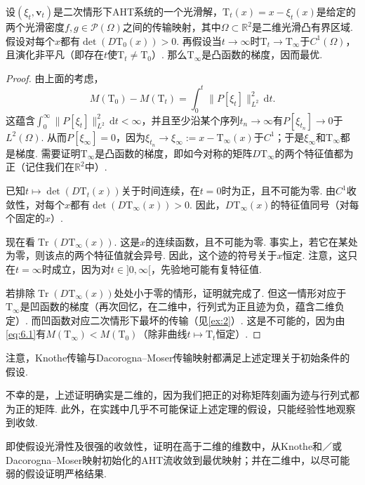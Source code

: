 \begin{proposition}\label{obj:6.3}
设$(\xi_t,\mathbf v_t)$是二次情形下AHT系统的一个光滑解，$\mathrm T_t(x)=x-\xi_t(x)$是给定的两个光滑密度$f,g\in\mathscr P(\Omega)$之间的传输映射，其中$\Omega\subset\mathbb R^2$是二维光滑凸有界区域. 假设对每个$x$都有$\det(D\mathrm T_0(x))>0$. 再假设当$t\to\infty$时$\mathrm T_t\to\mathrm T_\infty$于$C^1(\Omega)$，且演化非平凡（即存在$t$使$\mathrm T_t\ne\mathrm T_0$）. 那么$\mathrm T_\infty$是凸函数的梯度，因而最优.
\end{proposition}
\begin{proof}
由上面的考虑，
\begin{equation}\label{eq:6.1}
M(\mathrm T_0)-M(\mathrm T_t)=\int_0^t\|P[\xi_t]\|_{L^2}^2\,\mathrm dt.
\end{equation}
这蕴含$\int_0^\infty\|P[\xi_t]\|_{L^2}^2\,\mathrm dt<\infty$，并且至少沿某个序列$t_n\to\infty$有$P[\xi_{t_n}]\to0$于$L^2(\Omega)$. 从而$P[\xi_\infty]=0$，因为$\xi_{t_n}\to\xi_\infty:=x-\mathrm T_\infty(x)$于$C^1$；于是$\xi_\infty$和$\mathrm T_\infty$都是梯度. 需要证明$\mathrm T_\infty$是凸函数的梯度，即如今对称的矩阵$D\mathrm T_\infty$的两个特征值都为正（记住我们在$\mathbb R^2$中）.

已知$t\mapsto\det(D\mathrm T_t(x))$关于时间连续，在$t=0$时为正，且不可能为零. 由$C^1$收敛性，对每个$x$都有$\det(D\mathrm T_\infty(x))>0$. 因此，$D\mathrm T_\infty(x)$的特征值同号（对每个固定的$x$）.

现在看$\operatorname{Tr}(D\mathrm T_\infty(x))$. 这是$x$的连续函数，且不可能为零. 事实上，若它在某处为零，则该点的两个特征值就会异号. 因此，这个迹的符号关于$x$恒定. 注意，这只在$t=\infty$时成立，因为对$t\in]0,\infty[$，先验地可能有复特征值.

若排除$\operatorname{Tr}(D\mathrm T_\infty(x))$处处小于零的情形，证明就完成了. 但这一情形对应于$\mathrm T_\infty$是凹函数的梯度（再次回忆，在二维中，行列式为正且迹为负，蕴含二维负定）. 而凹函数对应二次情形下最坏的传输（见\autoref{ex:2}）. 这是不可能的，因为由\eqref{eq:6.1}有$M(\mathrm T_\infty)<M(\mathrm T_0)$（除非曲线$t\mapsto\mathrm T_t$恒定）.
\end{proof}

注意，Knothe传输与Dacorogna--Moser传输映射都满足上述定理关于初始条件的假设.

不幸的是，上述证明确实是二维的，因为我们把正的对称矩阵刻画为迹与行列式都为正的矩阵. 此外，在实践中几乎不可能保证上述定理的假设，只能经验性地观察到收敛.

\begin{openproblem}[AHT的收敛]
即使假设光滑性及很强的收敛性，证明在高于二维的维数中，从Knothe和／或Dacorogna--Moser映射初始化的AHT流收敛到最优映射；并在二维中，以尽可能弱的假设证明严格结果.
\end{openproblem}
